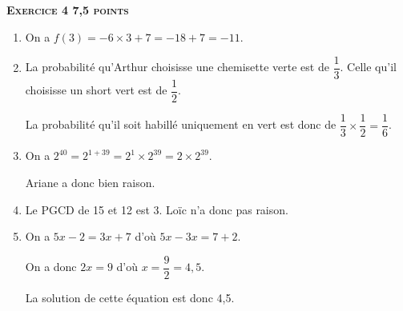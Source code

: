 \textbf{\textsc{Exercice 4 \hfill 7,5 points}}

\medskip

\begin{enumerate}
\item On a $f(3) = - 6 \times 3 + 7 = -18 + 7 = -11$.
\item La probabilité qu'Arthur choisisse une chemisette verte est de $\dfrac{1}{3}$. Celle qu'il choisisse un short vert est de $\dfrac{1}{2}$.
  
La probabilité qu'il soit habillé uniquement en vert est donc de $\dfrac{1}{3} \times \dfrac{1}{2} = \dfrac{1}{6}$.
\item On a $2^{40} = 2^{1 + 39} = 2^1 \times 2^{39} = 2 \times 2^{39}$.
  
Ariane a donc bien raison.
\item Le PGCD de 15 et 12 est 3. Loïc n'a donc pas raison.
\item On a $5x - 2 = 3x + 7$ d'où $5x - 3x = 7 + 2$.
  
On a donc $2x = 9$ d'où $x = \dfrac{9}{2} = 4,5$.
  
La solution de cette équation est donc 4,5.
\end{enumerate}

\newpage

